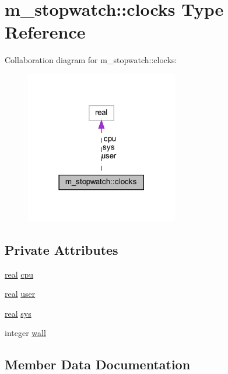 \hypertarget{structm__stopwatch_1_1clocks}{}\section{m\+\_\+stopwatch\+:\+:clocks Type Reference}
\label{structm__stopwatch_1_1clocks}


Collaboration diagram for m\+\_\+stopwatch\+:\+:clocks\+:
\nopagebreak
\begin{figure}[H]
\begin{center}
\leavevmode
\includegraphics[width=189pt]{structm__stopwatch_1_1clocks__coll__graph}
\end{center}
\end{figure}
\subsection*{Private Attributes}
\begin{DoxyCompactItemize}
\item 
\hyperlink{read__watch_83_8txt_abdb62bde002f38ef75f810d3a905a823}{real} \hyperlink{structm__stopwatch_1_1clocks_a9a1b2b546eed6ae3cec4d46c529a32f9}{cpu}
\item 
\hyperlink{read__watch_83_8txt_abdb62bde002f38ef75f810d3a905a823}{real} \hyperlink{structm__stopwatch_1_1clocks_a6734a01073d44a271b14f6c7e266fa61}{user}
\item 
\hyperlink{read__watch_83_8txt_abdb62bde002f38ef75f810d3a905a823}{real} \hyperlink{structm__stopwatch_1_1clocks_a86554366f47cf591953288ad9addea53}{sys}
\item 
integer \hyperlink{structm__stopwatch_1_1clocks_a8c979e58959961744ee85e5f44fbaf64}{wall}
\end{DoxyCompactItemize}


\subsection{Member Data Documentation}
\mbox{\label{structm__stopwatch_1_1clocks_a9a1b2b546eed6ae3cec4d46c529a32f9}} 
